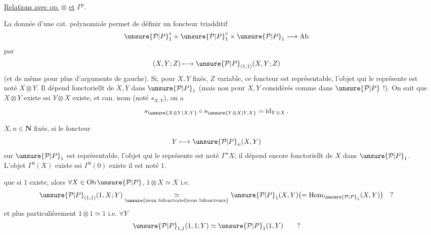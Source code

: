 \uline{Relations avec op.} $\otimes$ \uline{et} $\Gamma^p$.

La donnée d'une cat. polynomiale  permet de définir un foncteur triadditif
\[
\unsure{\mathcal P|P}_1^\circ\times \unsure{\mathcal P|P}_1^\circ\times \unsure{\mathcal P|P}_1\longrightarrow\operatorname{Ab}
\]
par
\[
(X,Y;Z)\longmapsto \unsure{\mathcal P|P}_{(1,1)}(X,Y;Z)
\]
(et de même pour plus d'arguments de gauche).
Si, pour $X,Y$ fixés, $Z$ variable, ce foncteur est représentable, l'objet qui le représente est noté $X\otimes Y$. Il dépend fonctoriellt de $X,Y$ dans $\unsure{\mathcal P|P}_1$ (mais non pour $X,Y$  considérés comme dans $\unsure{\mathcal P|P}$ !).  On sait que $X\otimes Y$ existe ssi $Y\otimes X$ existe, et  can. isom (noté $s_{X,Y}$), on a
\[
s_{\unsure{X\otimes Y|X,Y}}\circ s_{\unsure{Y\otimes X|Y,X}}=\operatorname{id}_{Y\otimes X}.
\]

 $X,n\in\mathbf N$ fixés, si le foncteur
\[
Y\longmapsto \unsure{\mathcal P|P}_n(X,Y)
\]
sur $\unsure{\mathcal P|P}_1$ est représentable, l'objet qui le représente est noté $\Gamma^n X$; il dépend encore fonctoriellt de $X$ dans $\unsure{\mathcal P|P}_1$. L'objet $\Gamma^0(X)$ existe ssi $\Gamma^0(0)$ existe il est noté $1$.

 que \deleted{\unsure{$\forall$}} si $1$ existe, alors $\forall X\in\operatorname{Ob}\unsure{\mathcal P|P}$, $1\otimes X\simeq X$ i.e.
\[
\unsure{\mathcal P|P}_{(1,1)}(1,X;Y)\mathrel{\mathop{\simeq}\limits_{\unsure{\text{isom bifonctoriel}|\text{sous bifoncteurs}}}}\unsure{\mathcal P|P}_1(X,Y)\bigl(=\operatorname{Hom}_{\unsure{\mathcal P|P}_1}(X,Y)\bigr)\quad ?
\]
et plus particulièrement $1\otimes1\simeq1$ i.e. $\forall Y$
\[
\unsure{\mathcal P|P}_{1,1}(1,1;Y)\simeq \unsure{\mathcal P|P}_1(1,Y)\qquad ?
\]

